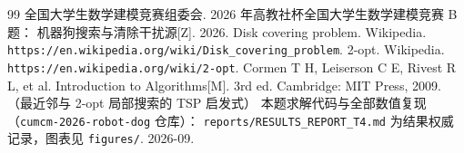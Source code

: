
\begin{thebibliography}{99}
 全国大学生数学建模竞赛组委会. 2026 年高教社杯全国大学生数学建模竞赛 B 题：
                    机器狗搜索与清除干扰源[Z]. 2026.
 Disk covering problem. Wikipedia.
                    \texttt{https://en.wikipedia.org/wiki/Disk\_covering\_problem}.
 2-opt. Wikipedia. \texttt{https://en.wikipedia.org/wiki/2-opt}.
 Cormen T H, Leiserson C E, Rivest R L, et al. Introduction to Algorithms[M].
                 3rd ed. Cambridge: MIT Press, 2009. （最近邻与 2-opt 局部搜索的 TSP 启发式）
 本题求解代码与全部数值复现（\texttt{cumcm-2026-robot-dog} 仓库）：
              \texttt{reports/RESULTS\_REPORT\_T4.md} 为结果权威记录，图表见
              \texttt{figures/}. 2026-09.
\end{thebibliography}